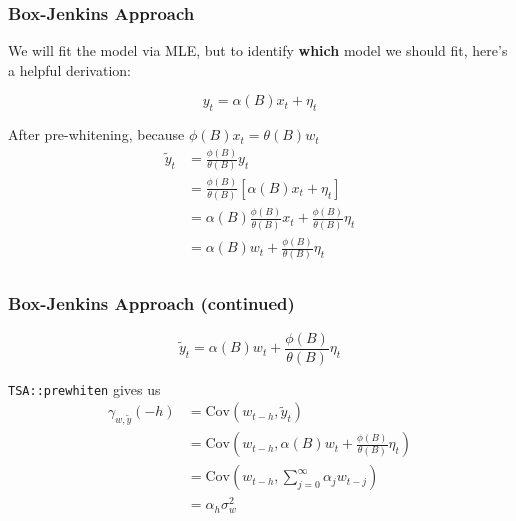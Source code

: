 \documentclass[%
xcolor=pdftex]{beamer}
\begin{document}
\begin{frame}
\frametitle{Box-Jenkins Approach}

We will fit the model via MLE, but to identify {\bf which} model we should fit, here's a helpful derivation:

$$
y_t = \alpha(B) x_t + \eta_t
$$

After pre-whitening, because $\phi(B) x_t = \theta(B) w_t$
\begin{align*}
\tilde{y}_t &= \frac{\phi(B)}{\theta(B)} y_t \\
&= \frac{\phi(B)}{\theta(B)} \left[ \alpha(B) x_t + \eta_t \right] \\
&=  \alpha(B)\frac{\phi(B)}{\theta(B)} x_t + \frac{\phi(B)}{\theta(B)} \eta_t  \\
&=  \alpha(B) w_t + \frac{\phi(B)}{\theta(B)} \eta_t  \\
\end{align*}



\end{frame}



\begin{frame}[fragile]\frametitle{Box-Jenkins Approach (continued)}


$$
\tilde{y}_t =  \alpha(B) w_t + \frac{\phi(B)}{\theta(B)} \eta_t  
$$

\verb|TSA::prewhiten| gives us
\begin{align*}
\gamma_{w,\tilde{y}}(-h) &= \text{Cov}\left(w_{t-h}, \tilde{y}_t \right) \\
&= \text{Cov}\left(w_{t-h}, \alpha(B) w_t + \frac{\phi(B)}{\theta(B)} \eta_t \right) \\
&= \text{Cov}\left(w_{t-h}, \sum_{j=0}^{\infty} \alpha_j w_{t-j} \right) \\
&= \alpha_h \sigma^2_w 
\end{align*}


\end{frame}
\end{document}
